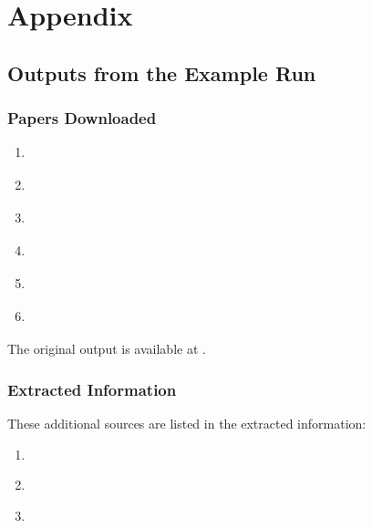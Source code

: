 \documentclass[
	fontsize = 11pt,
	paper = a4,
	draft = false,
	twoside = true,
	titlepage = false
]{scrartcl}
\numberwithin{equation}{subsection}
\begin{document}
	\FloatBarrier
	\pagebreak
	\printbibliography
	\pagebreak
	\appendix
	\section{Appendix}
	\subsection{Outputs from the Example Run}
	\subsubsection{Papers Downloaded} \label{appendix:src}
	\begin{enumerate} \label{enum:papers}
		\item {} \label{enum:1} \autocite{paper1_Gaiardoni_2025}
		\item {} \label{enum:2} \autocite{paper2_Ezawa_2025}
		\item {} \autocite{paper3_Funato_2021}
		\item {} \autocite{paper4_Auvray_2018}
		\item {} \autocite{paper5_rashba2018electricdipolespinresonances}
		\item {} \autocite{paper6_Engel_2007}
	\end{enumerate}
	The original output is available at \autocite{gitSources}.
	
	\subsubsection{Extracted Information} \label{appendix:exInfo}
	These additional sources are listed in the extracted information:
	\begin{enumerate}[resume]
		\item {} \autocite{paper7_PismaZhETF.39.66}
		\item {} \autocite{paper8_Edelstein1990SpinPO}
		\item {} \autocite{paper9}
	\end{enumerate}
	
\end{document}
